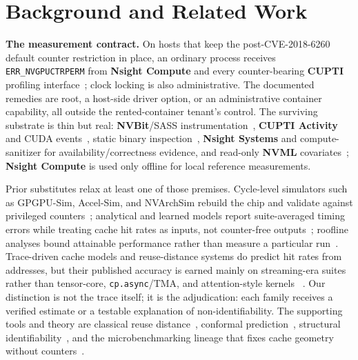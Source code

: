 \documentclass[conference]{IEEEtran}
\begin{document}
\section{Background and Related Work}
\label{sec:related}

\textbf{The measurement contract.} On hosts that keep the post-CVE-2018-6260
default counter restriction in place, an ordinary process receives
\texttt{ERR\_NVGPUCTRPERM} from \textbf{Nsight Compute} and every
counter-bearing \textbf{CUPTI} profiling interface~\cite{nvidia_errnvgpuctrperm,nvidia_nsightcompute,nvidia_cupti};
clock locking is also administrative. The documented remedies are root,
a host-side driver option, or an administrative container capability, all
outside the rented-container tenant's control. The surviving substrate is
thin but real: \textbf{NVBit}/SASS instrumentation~\cite{villa2019nvbit,stephenson2015sassi},
\textbf{CUPTI Activity} and CUDA events~\cite{nvidia_cupti_activity},
static binary inspection~\cite{nvidia_cudabinutils}, \textbf{Nsight Systems}
and compute-sanitizer for availability/correctness evidence, and read-only
\textbf{NVML} covariates~\cite{nvidia_nvml}; \textbf{Nsight Compute} is used
only offline for local reference measurements.

Prior substitutes relax at least one of those premises. Cycle-level simulators
such as GPGPU-Sim, Accel-Sim, and NVArchSim rebuild the chip and validate
against privileged counters~\cite{bakhoda2009gpgpusim,khairy2020accelsim,villa2021nvarchsim};
analytical and learned models report suite-averaged timing errors while
treating cache hit rates as inputs, not counter-free outputs~\cite{hong2009analytical,lee2022gcom,lee2025neusight};
roofline analyses bound attainable performance rather than measure a
particular run~\cite{williams2009roofline,yang2020hierarchical}. Trace-driven
cache models and reuse-distance systems do predict hit rates from addresses,
but their published accuracy is earned mainly on streaming-era suites rather
than tensor-core, \texttt{cp.async}/TMA, and attention-style kernels
~\cite{nugteren2014gpucache,kiani2018reuse,arafa2021pptgpu,arafa2020reuse}.
Our distinction is not the trace itself; it is the adjudication: each family
receives a verified estimate or a testable explanation of non-identifiability. The
supporting tools and theory are classical reuse distance~\cite{mattson1970},
conformal prediction~\cite{vovk2005alrw}, structural
identifiability~\cite{villaverde2016structural}, and the microbenchmarking
lineage that fixes cache geometry without counters~\cite{wong2010demystifying,mei2017dissecting,jia2018volta,jarmusch2025blackwell}.
\end{document}

